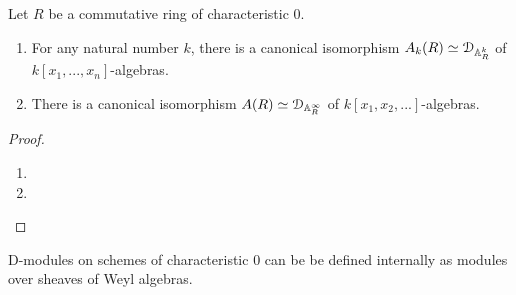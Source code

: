             \begin{theorem} \label{theorem: differential_operators_as_elements_of_weyl_algebras}
                Let $R$ be a commutative ring of characteristic $0$. 
                    \begin{enumerate}
                        \item For any natural number $k$, there is a canonical isomorphism $A_k(R) \simeq \mathcal{D}_{\mathbb{A}^k_R}$ of $k[x_1, ..., x_n]$-algebras.
                        \item There is a canonical isomorphism $A(R) \simeq \mathcal{D}_{\mathbb{A}^{\infty}_R}$ of $k[x_1, x_2, ...]$-algebras.
                    \end{enumerate}
            \end{theorem}
                \begin{proof}
                    \noindent
                    \begin{enumerate}
                        \item 
                        \item 
                    \end{enumerate}
                \end{proof}
            \begin{corollary}
                D-modules on schemes of characteristic $0$ can be be defined internally as modules over sheaves of Weyl algebras. 
            \end{corollary}
                
